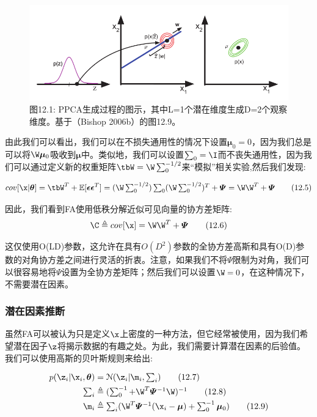 \documentclass[a4paper]{article}
\begin{document}
\begin{figure}[h]
	\centering
	\includegraphics[width=1\linewidth]{fig/figure1}
	\caption*{图12.1: PPCA生成过程的图示，其中L=1个潜在维度生成D=2个观察维度。基于（Bishop 2006b）的图12.9。}
\end{figure}

\clearpage
由此我们可以看出，我们可以在不损失通用性的情况下设置$\boldsymbol{\mu}_0=0$，因为我们总是可以将$\W\boldsymbol{\mu}_0$吸收到$\boldsymbol{\mu}$中。类似地，我们可以设置$\sum\nolimits_{0}=\I$而不丧失通用性，因为我们可以通过定义新的权重矩阵$\tbW=\W\sum\nolimits_{0}^{-1/2}$来“模拟”相关实验,然后我们发现: 

\begin{equation}
cov[\x\vert\boldsymbol{\theta}]=\tbW^T+\mathbb{E}[\boldsymbol{\epsilon}\boldsymbol{\epsilon}^T]=(\W\textstyle\sum\nolimits_{0}^{-1/2})\sum\nolimits_{0}(\W\textstyle\sum\nolimits_{0}^{-1/2})^T+\boldsymbol{\varPsi}=\W\W^T+\boldsymbol{\varPsi}\tag{12.5}
\end{equation}

因此，我们看到FA使用低秩分解近似可见向量的协方差矩阵:
\begin{equation}
\C\triangleq cov[\x]=\W\W^T+\boldsymbol{\varPsi}
\tag{12.6}
\end{equation}

这仅使用O(LD)参数，这允许在具有$O(D^2)$参数的全协方差高斯和具有O(D)参数的对角协方差之间进行灵活的折衷。注意，如果我们不将$\boldsymbol{\varPsi}$限制为对角，我们可以很容易地将$\boldsymbol{\varPsi}$设置为全协方差矩阵；然后我们可以设置$\W=0$，在这种情况下，不需要潜在因素。

\subsubsection{潜在因素推断}
虽然FA可以被认为只是定义$\x$上密度的一种方法，但它经常被使用，因为我们希望潜在因子$\z$将揭示数据的有趣之处。为此，我们需要计算潜在因素的后验值。我们可以使用高斯的贝叶斯规则来给出:


\begin{align}
p(\z_i\vert\x_i,\boldsymbol{\theta})&=\mathcal{N}(\z_i\vert\m_i,\textstyle\sum\nolimits_{i})\tag{12.7}\\
\textstyle\sum\nolimits_{i}&\triangleq (\textstyle\sum\nolimits_{0}^{-1}+\W^T\boldsymbol{\varPsi}^{-1}\W)^{-1}\tag{12.8}\\
\m_i&\triangleq \textstyle\sum\nolimits_{i}(\W^T\boldsymbol{\varPsi}^{-1}(\x_i-\boldsymbol{\mu})+\textstyle\sum\nolimits_{0}^{-1}\boldsymbol{\mu}_0)\tag{12.9}
\end{align}
\end{document}
